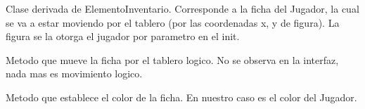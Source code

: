 \documentclass[letterpaper,10pt,english]{sphinxmanual}
\begin{document}
\begin{fulllineitems}
\label{\detokenize{codigo:inventario.Ficha}}
Clase derivada de ElementoInventario. Corresponde a la ficha del Jugador, la cual
se va a estar moviendo por el tablero (por las coordenadas x, y de figura). La figura
se la otorga el jugador por parametro en el init.

\begin{fulllineitems}
\label{\detokenize{codigo:inventario.Ficha.mover}}
Metodo que mueve la ficha por el tablero logico. No se observa en la interfaz, nada mas
es movimiento logico.

\end{fulllineitems}


\begin{fulllineitems}
\label{\detokenize{codigo:inventario.Ficha.setColor}}
Metodo que establece el color de la ficha. En nuestro caso es el color del Jugador.

\end{fulllineitems}


\end{fulllineitems}

\end{document}
